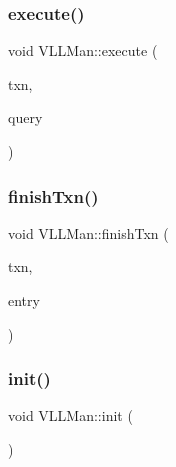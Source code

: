 \mbox{\label{classVLLMan_a766e95fdf411e87dcbde34940ef98ce1}} 
\subsubsection{\texorpdfstring{execute()}{execute()}}
{\footnotesize\ttfamily void V\+L\+L\+Man\+::execute (\begin{DoxyParamCaption}\item[{\hyperlink{classtxn__man}{txn\+\_\+man} $\ast$}]{txn,  }\item[{\hyperlink{classbase__query}{base\+\_\+query} $\ast$}]{query }\end{DoxyParamCaption})}

\mbox{\label{classVLLMan_a7366863b5f2b9158d022344be487cb5e}} 
\subsubsection{\texorpdfstring{finish\+Txn()}{finishTxn()}}
{\footnotesize\ttfamily void V\+L\+L\+Man\+::finish\+Txn (\begin{DoxyParamCaption}\item[{\hyperlink{classtxn__man}{txn\+\_\+man} $\ast$}]{txn,  }\item[{\hyperlink{classTxnQEntry}{Txn\+Q\+Entry} $\ast$}]{entry }\end{DoxyParamCaption})}

\mbox{\label{classVLLMan_a598c042910b0fc6dff90141de1fbc89b}} 
\subsubsection{\texorpdfstring{init()}{init()}}
{\footnotesize\ttfamily void V\+L\+L\+Man\+::init (\begin{DoxyParamCaption}{ }\end{DoxyParamCaption})}

\mbox{\label{classVLLMan_a3c4fb364b0a0af7d38ee00d846b3524a}} 
